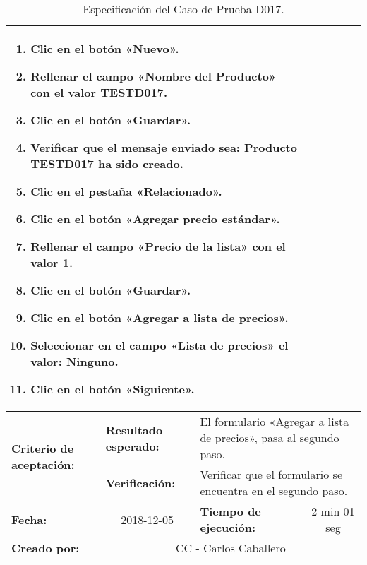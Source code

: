 \begin{table}
\begin{tabular}{|p{2.5cm}|p{2.8cm}|p{2.2cm}|p{2.8cm}|p{2.2cm}|}
\multicolumn{4}{p{11.8cm}|}{\footnotesize{
\vspace{-3mm}
\begin{enumerate}
\item Clic en el botón «Nuevo».
\item Rellenar el campo «Nombre del Producto» con el valor \textbf{TESTD017}.
\item Clic en el botón «Guardar».
\item Verificar que el mensaje enviado sea:
    \textbf{Producto TESTD017 ha sido creado}.
\item Clic en el pestaña «Relacionado».
\item Clic en el botón «Agregar precio estándar».
\item Rellenar el campo «Precio de la lista» con el valor \textbf{1}.
\item Clic en el botón «Guardar».
\item Clic en el botón «Agregar a lista de precios».
\item Seleccionar en el campo «Lista de precios» el valor: \textbf{Ninguno}.
\item Clic en el botón «Siguiente».
\end{enumerate}
\vspace{-5mm}
}} \\
\hline
\multirow{2}{2.8cm}{\footnotesize{\textbf{Criterio de aceptación:}}} &
\footnotesize{\textbf{Resultado esperado:}} &
\multicolumn{3}{p{9.1cm}|}{\footnotesize{El formulario «Agregar a lista de
precios», pasa al segundo paso.}} \\
\cline{2-5}
& \footnotesize{\textbf{Verificación:}} &
\multicolumn{3}{p{9.1cm}|}{\footnotesize{Verificar que el formulario se
encuentra en el segundo paso.}} \\
\hline
\footnotesize{\textbf{Fecha:}} &
\multicolumn{1}{c|}{\footnotesize{2018-12-05}} &
\multicolumn{2}{l|}{\footnotesize{\textbf{Tiempo de ejecución:}}} &
\multicolumn{1}{c|}{\footnotesize{2 min 01 seg}} \\
\hline
\footnotesize{\textbf{Creado por:}} &
\multicolumn{4}{c|}{\footnotesize{CC - Carlos Caballero}} \\
\hline
\end{tabular}
\caption{Especificación del Caso de Prueba D017.}
\label{tcd017}
\end{table}

